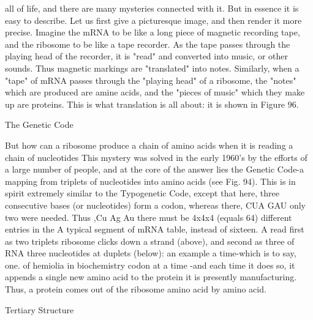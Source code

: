 {all of life, and there are many mysteries connected with it. But in essence it is easy to
describe. Let us first give a picturesque image, and then render it more precise. Imagine the
mRNA to be like a long piece of magnetic recording tape, and the ribosome to be like a tape
recorder. As the tape passes through the playing head of the recorder, it is "read" and
converted into music, or other sounds. Thus magnetic markings are "translated" into notes.
Similarly, when a "tape" of mRNA passes through the "playing head" of a ribosome, the
"notes" which are produced are amine acids, and the "pieces of music" which they make up
are proteins. This is what translation is all about: it is shown in Figure 96.


                                      The Genetic Code

But how can a ribosome produce a chain of amino acids when it is reading a chain of
nucleotides This mystery was solved in the early 1960's by the efforts of a large number
of people, and at the core of the answer lies the Genetic Code-a mapping from triplets of
nucleotides into amino acids (see Fig. 94). This is in spirit extremely similar to the
Typogenetic     Code,      except     that     here,    three consecutive     bases     (or
nucleotides)                                                             form a codon,
whereas there,                        CUA GAU                            only two were
needed. Thus                         ,Cu Ag Au                           there must be
4x4x4 (equals                                                            64)      different
entries in the                 A typical segment   of mRNA               table, instead of
sixteen.     A                   read first as two triplets              ribosome clicks
down a strand                  (above), and second as three              of RNA three
nucleotides at                 duplets (below): an example               a time-which is
to say, one.                   of hemiolia in biochemistry               codon at a time
-and      each                                                           time it does so,
it appends a single new amino acid to the protein it is presently manufacturing. Thus, a
protein comes out of the ribosome amino acid by amino acid.

                                      Tertiary Structure

}
